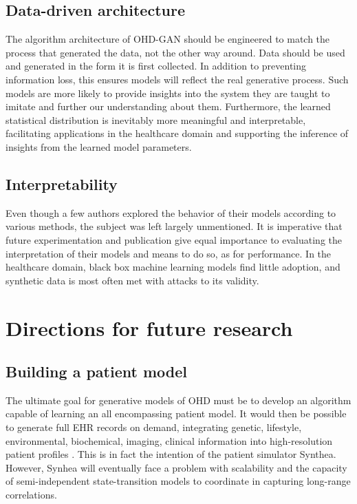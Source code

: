 \subsection{Data-driven architecture}\label{sec:archi}
The algorithm architecture of OHD-GAN should be engineered to match the process that generated the data, not the other way around. Data should be used and generated in the form it is first collected. In addition to preventing information loss, this ensures models will reflect the real generative process. Such models are more likely to provide insights into the system they are taught to imitate and further our understanding about them. Furthermore, the learned statistical distribution is inevitably more meaningful and interpretable, facilitating applications in the healthcare domain and supporting the inference of insights from the learned model parameters.
\subsection{Interpretability}
Even though a few authors explored the behavior of their models according to various methods, the subject was left largely unmentioned. It is imperative that future experimentation and publication give equal importance to evaluating the interpretation of their models and means to do so, as for performance. In the healthcare domain, black box machine learning models find little adoption, and synthetic data is most often met with attacks to its validity.

\section{Directions for future research}
\subsection{Building a patient model}
The ultimate goal for generative models of OHD must be to develop an algorithm capable of learning an all encompassing patient model. It would then be possible to generate full EHR records on demand, integrating genetic, lifestyle, environmental, biochemical, imaging, clinical information into high-resolution patient profiles \cite{Capobianco2020}. This is in fact the intention of the patient simulator Synthea. However, Synhea will eventually face a problem with scalability and the capacity of semi-independent state-transition models to coordinate in capturing long-range correlations.\par

